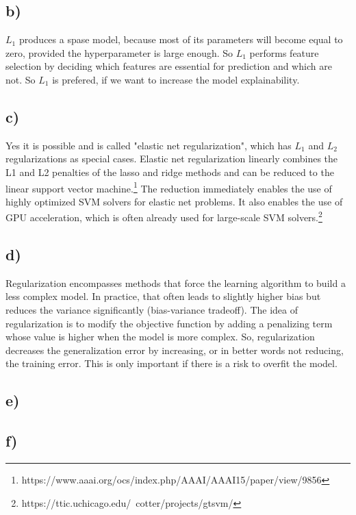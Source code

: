 \documentclass[a4paper]{article}
\begin{document}
    \subsection*{b)}
        $L_1$ produces a spase model, because most of its parameters will become equal to zero, provided the hyperparameter is large enough.
        So $L_1$ performs feature selection by deciding which features are essential for prediction and which are not.
        So $L_1$ is prefered, if we want to increase the model explainability.

    
    \subsection*{c)}
        Yes it is possible and is called "elastic net regularization", which has $L_1$ and $L_2$ regularizations as special cases.
        Elastic net regularization linearly combines the L1 and L2 penalties of the lasso and ridge methods and can be reduced to the linear support vector machine.\footnote{https://www.aaai.org/ocs/index.php/AAAI/AAAI15/paper/view/9856}
        The reduction immediately enables the use of highly optimized SVM solvers for elastic net problems. It also enables the use of GPU acceleration, which is often already used for large-scale SVM solvers.\footnote{https://ttic.uchicago.edu/~cotter/projects/gtsvm/}
    
    \subsection*{d)}
        Regularization encompasses methods that force the learning algorithm to build a less complex model.
        In practice, that often leads to slightly higher bias but reduces the variance significantly (bias-variance tradeoff).
        The idea of regularization is to modify the objective function by adding a penalizing term whose value is higher when the model is more complex.
        So, regularization decreases the generalization error by increasing, or in better words not reducing, the training error.
        This is only important if there is a risk to overfit the model. 

    
    \subsection*{e)}
    

    
    \subsection*{f)}
    
\end{document}
